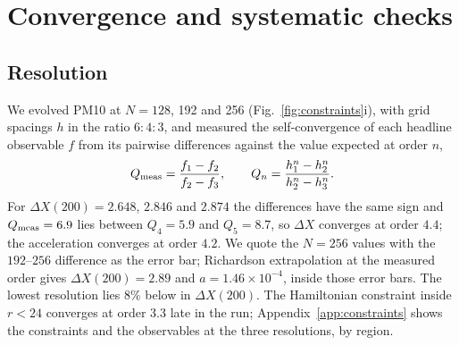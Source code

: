 \documentclass[twocolumn,floatfix,aps,prd,superscriptaddress,nofootinbib]{revtex4-2}
\begin{document}
\section{Convergence and systematic checks}
\label{sec:caveats}

\subsection{Resolution}
\label{sec:convergence}

We evolved PM10 at $N=128$, 192 and 256 (Fig.~\ref{fig:constraints}i), with grid spacings $h$ in the ratio $6:4:3$, and measured the self-convergence of each headline observable $f$ from its pairwise differences against the value expected at order $n$,
\begin{equation}
Q_{\rm meas}=\frac{f_1-f_2}{f_2-f_3},\qquad
Q_n=\frac{h_1^n-h_2^n}{h_2^n-h_3^n}.
\label{eq:qmeas}
\end{equation}
For $\Delta X(200)=2.648$, $2.846$ and $2.874$ the differences have the same sign and $Q_{\rm meas}=6.9$ lies between $Q_4=5.9$ and $Q_5=8.7$, so $\Delta X$ converges at order $4.4$; the acceleration converges at order $4.2$. We quote the $N=256$ values with the $192$--$256$ difference as the error bar; Richardson extrapolation at the measured order gives $\Delta X(200)=2.89$ and $a=1.46\times10^{-4}$, inside those error bars. The lowest resolution lies $8\%$ below in $\Delta X(200)$. The Hamiltonian constraint inside $r<24$ converges at order $3.3$ late in the run; Appendix~\ref{app:constraints} shows the constraints and the observables at the three resolutions, by region.
\end{document}
